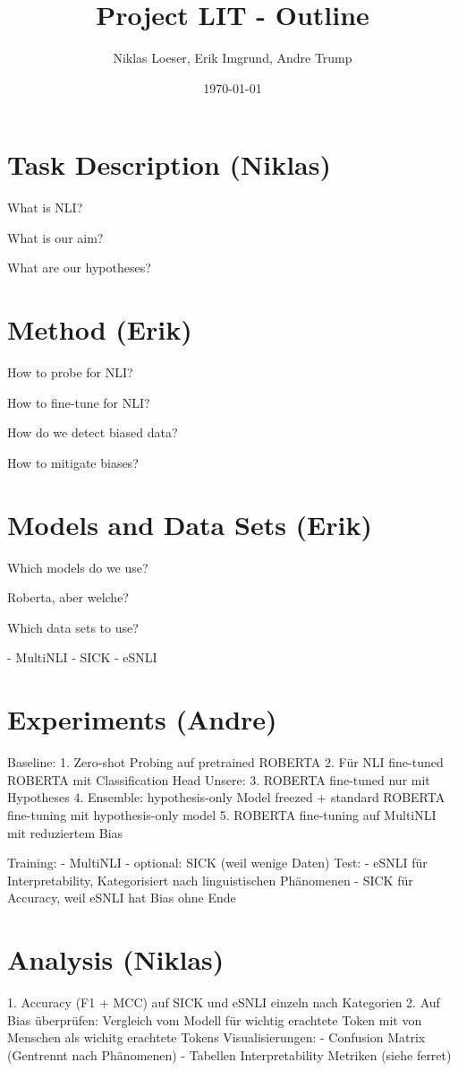 \documentclass[12pt,a4paper]{article}
\title{Project LIT - Outline}
\author{Niklas Loeser, Erik Imgrund, Andre Trump}
\date{\today}
\begin{document}
\begin{acronym}
\end{acronym}

\maketitle

\section{Task Description (Niklas)}
What is NLI?

What is our aim?

What are our hypotheses?

\section{Method (Erik)}
How to probe for NLI?

How to fine-tune for NLI?

How do we detect biased data?

How to mitigate biases?

\section{Models and Data Sets (Erik)}
Which models do we use?

Roberta, aber welche?

Which data sets to use?

- MultiNLI
- SICK
- eSNLI

\section{Experiments (Andre)}
Baseline:
1. Zero-shot Probing auf pretrained ROBERTA
2. Für NLI fine-tuned ROBERTA mit Classification Head
Unsere:
3. ROBERTA fine-tuned nur mit Hypotheses
4. Ensemble: hypothesis-only Model freezed + standard ROBERTA fine-tuning mit hypothesis-only model
5. ROBERTA fine-tuning auf MultiNLI mit reduziertem Bias

Training:
- MultiNLI
- optional: SICK (weil wenige Daten)
Test:
- eSNLI für Interpretability, Kategorisiert nach linguistischen Phänomenen
- SICK für Accuracy, weil eSNLI hat Bias ohne Ende

\section{Analysis (Niklas)}
1. Accuracy (F1 + MCC) auf SICK und eSNLI einzeln nach Kategorien
2. Auf Bias überprüfen: Vergleich vom Modell für wichtig erachtete Token mit von Menschen als wichitg erachtete Tokens
Visualisierungen:
- Confusion Matrix (Gentrennt nach Phänomenen)
- Tabellen Interpretability Metriken (siehe ferret)


\printbibliography
\end{document}
